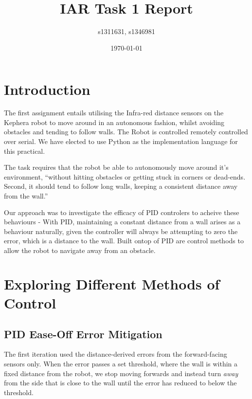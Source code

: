 \documentclass[11pt,a4wide]{article}
\begin{document}
\title{IAR Task 1 Report}
\author{s1311631, s1346981}
\date{\today}
\maketitle


\section{Introduction}

The first assignment entails utilising the Infra-red distance sensors on the Kephera 
robot to move around in an autonomous fashion, whilst avoiding obstacles and tending 
to follow walls. The Robot is controlled remotely controlled over serial. We have 
elected to use Python as the implementation language for this practical.

The task requires that the robot be able to autonomously move around it's environment,
``without hitting obstacles or getting stuck in corners or dead-ends. Second, it should 
tend to follow long walls, keeping a consistent distance away from the wall.''

Our approach was to investigate the efficacy of PID controlers to acheive 
these behaviours - With PID, maintaining a constant distance from a wall arises as
a behaviour naturally, given the controller will always be attempting to zero the 
error, which is a distance to the wall. Built ontop of PID are control methods to
allow the robot to navigate away from an obstacle.


\section{Exploring Different Methods of Control}

\subsection{PID Ease-Off Error Mitigation}


The first iteration used the distance-derived errors from the forward-facing 
sensors only. When the error passes a set threshold, where the wall is within a 
fixed distance from the robot, we stop moving forwards and instead turn \emph{away} 
from the side that is close to the wall until the error has reduced to below the 
threshold.
\end{document}

